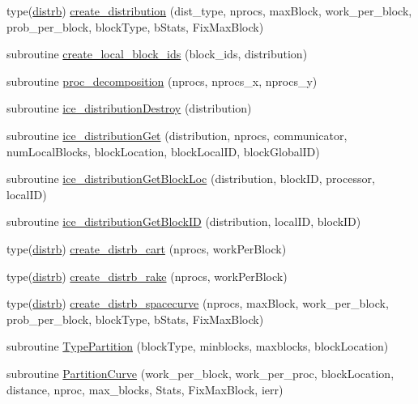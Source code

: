 \begin{DoxyCompactItemize}
\item 
type(\hyperlink{typeice__distribution_1_1distrb}{distrb}) \hyperlink{namespaceice__distribution_aa44f38ec08146a52959957cbad5b093d}{create\_\-distribution} (dist\_\-type, nprocs, maxBlock, work\_\-per\_\-block, prob\_\-per\_\-block, blockType, bStats, FixMaxBlock)
\item 
subroutine \hyperlink{namespaceice__distribution_a8f328e752d1852d365225748260e0729}{create\_\-local\_\-block\_\-ids} (block\_\-ids, distribution)
\item 
subroutine \hyperlink{namespaceice__distribution_a53b1d1fb3c8ddf978561163a12c8b1a4}{proc\_\-decomposition} (nprocs, nprocs\_\-x, nprocs\_\-y)
\item 
subroutine \hyperlink{namespaceice__distribution_ae535b4181fd7a39a623c9b02de3c1fcf}{ice\_\-distributionDestroy} (distribution)
\item 
subroutine \hyperlink{namespaceice__distribution_af81cb7cb3d7c4651703ab5141b5a98d1}{ice\_\-distributionGet} (distribution, nprocs, communicator, numLocalBlocks, blockLocation, blockLocalID, blockGlobalID)
\item 
subroutine \hyperlink{namespaceice__distribution_a07a309ffe5759ad00fc5f886ce65c175}{ice\_\-distributionGetBlockLoc} (distribution, blockID, processor, localID)
\item 
subroutine \hyperlink{namespaceice__distribution_a9a144b7580fefe29842479948f00f810}{ice\_\-distributionGetBlockID} (distribution, localID, blockID)
\item 
type(\hyperlink{typeice__distribution_1_1distrb}{distrb}) \hyperlink{namespaceice__distribution_a879fa1e845de0c882360a4e48c1ff50d}{create\_\-distrb\_\-cart} (nprocs, workPerBlock)
\item 
type(\hyperlink{typeice__distribution_1_1distrb}{distrb}) \hyperlink{namespaceice__distribution_aa5edcd4e7149b4d79d4b503b37607e9a}{create\_\-distrb\_\-rake} (nprocs, workPerBlock)
\item 
type(\hyperlink{typeice__distribution_1_1distrb}{distrb}) \hyperlink{namespaceice__distribution_af881e23fc62ccdac1da09fed38e55236}{create\_\-distrb\_\-spacecurve} (nprocs, maxBlock, work\_\-per\_\-block, prob\_\-per\_\-block, blockType, bStats, FixMaxBlock)
\item 
subroutine \hyperlink{namespaceice__distribution_a9dcac951f0df38305378d4edc49b40ae}{TypePartition} (blockType, minblocks, maxblocks, blockLocation)
\item 
subroutine \hyperlink{namespaceice__distribution_abcbf14893b6e339874e46663dd6d9640}{PartitionCurve} (work\_\-per\_\-block, work\_\-per\_\-proc, blockLocation, distance, nproc, max\_\-blocks, Stats, FixMaxBlock, ierr)

\end{DoxyCompactItemize}
